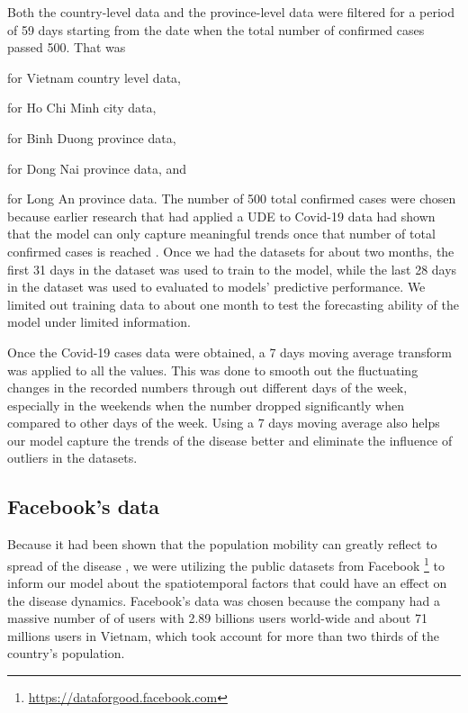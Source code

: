 Both the country-level data and the province-level data were filtered for a period of 59 days starting from the date when the total number of confirmed cases passed 500.
That was \date{May 14th 2021} for Vietnam country level data, \date{June 9th 2021} for Ho Chi Minh city data, \date{July 2nd 2021} for Binh Duong province data, \date{July 15th 2021} for Dong Nai province data, and \date{July 13th 2021} for Long An province data.
The number of 500 total confirmed cases were chosen because earlier research that had applied a \gls{UDE} to Covid-19 data had shown that the model can only capture meaningful trends once that number of total confirmed cases is reached \cite{dandekarMachineLearningAidedGlobal2020a}.
Once we had the datasets for about two months, the first 31 days in the dataset was used to train to the model, while the last 28 days in the dataset was used to evaluated to models' predictive performance.
We limited out training data to about one month to test the forecasting ability of the model under limited information.

Once the Covid-19 cases data were obtained, a 7 days moving average transform was applied to all the values.
This was done to smooth out the fluctuating changes in the recorded numbers through out different days of the week, especially in the weekends when the number dropped significantly when compared to other days of the week.
Using a 7 days moving average also helps our model capture the trends of the disease better and eliminate the influence of outliers in the datasets.

\subsection{Facebook's data}
\label{sec:methodologies-data-mobility-data}

Because it had been shown that the population mobility can greatly reflect to spread of the disease \cite{changMobilityNetworkModels2021,liSubstantialUndocumentedInfection2020,ihmecovid-19forecastingteamModelingCOVID19Scenarios2021}, we were utilizing the public datasets from Facebook \footnote{\url{https://dataforgood.facebook.com}} to inform our model about the spatiotemporal factors that could have an effect on the disease dynamics.
Facebook's data was chosen because the company had a massive number of of users with 2.89 billions users world-wide and about 71 millions users in Vietnam, which took account for more than two thirds of the country's population.

